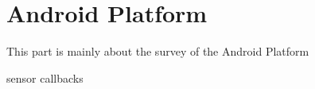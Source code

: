 \part{Android Platform}

This part is mainly about the survey of the Android Platform

{sensor}
{callbacks}




